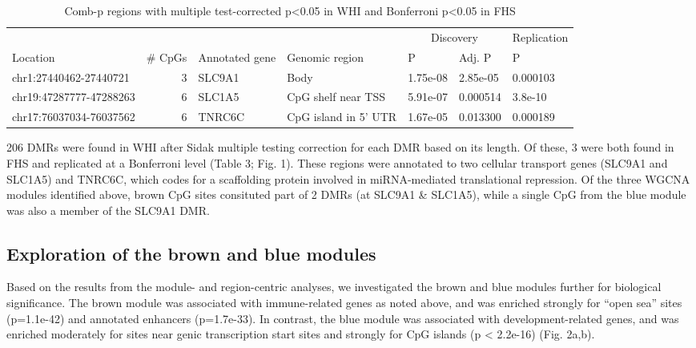 \documentclass[]{bmcart}
\theoremstyle{definition}
\theoremstyle{definition}
\theoremstyle{definition}
\theoremstyle{remark}
\begin{document}
\begin{table}

\caption{\label{tab:combp-results}Comb-p regions with multiple test-corrected p<0.05 in WHI and Bonferroni p<0.05 in FHS}
\centering
\begin{tabular}[t]{lrlllll}
\toprule
\multicolumn{1}{c}{} & \multicolumn{1}{c}{} & \multicolumn{1}{c}{} & \multicolumn{1}{c}{} & \multicolumn{2}{c}{Discovery} & \multicolumn{1}{c}{Replication} \\
\cmidrule(l{2pt}r{2pt}){5-6} \cmidrule(l{2pt}r{2pt}){7-7}
Location & \# CpGs & Annotated gene & Genomic region & P & Adj. P & P\\
\midrule
chr1:27440462-27440721 & 3 & SLC9A1 & Body & 1.75e-08 & 2.85e-05 & 0.000103\\
chr19:47287777-47288263 & 6 & SLC1A5 & CpG shelf near TSS & 5.91e-07 & 0.000514 & 3.8e-10\\
chr17:76037034-76037562 & 6 & TNRC6C & CpG island in 5' UTR & 1.67e-05 & 0.013300 & 0.000189\\
\bottomrule
\end{tabular}
\end{table}

206 DMRs were found in WHI after Sidak multiple testing correction for
each DMR based on its length. Of these, 3 were both found in FHS and
replicated at a Bonferroni level (Table 3; Fig. 1). These regions were
annotated to two cellular transport genes (SLC9A1 and SLC1A5) and
TNRC6C, which codes for a scaffolding protein involved in miRNA-mediated
translational repression. Of the three WGCNA modules identified above,
brown CpG sites consituted part of 2 DMRs (at SLC9A1 \& SLC1A5), while
a single CpG from the blue module was also a member of the SLC9A1 DMR.

\subsection{Exploration of the brown and blue
modules}\label{exploration-of-the-brown-and-blue-modules}

Based on the results from the module- and region-centric analyses, we
investigated the brown and blue modules further for biological
significance. The brown module was associated with immune-related genes
as noted above, and was enriched strongly for ``open sea'' sites
(p=1.1e-42) and annotated enhancers (p=1.7e-33). In contrast, the blue
module was associated with development-related genes, and was enriched
moderately for sites near genic transcription start sites and strongly
for CpG islands (p \textless{} 2.2e-16) (Fig. 2a,b).
\end{document}
